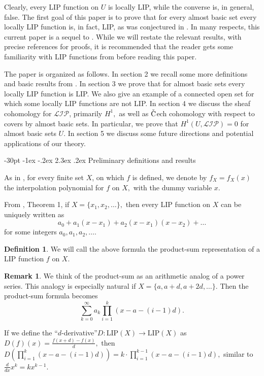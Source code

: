 \documentclass[10pt]{article}
\makeatletter
\renewcommand\section{\@startsection {section}{1}{\z@}
{-30pt \@plus -1ex \@minus -.2ex}
{2.3ex \@plus.2ex}
{\normalfont\normalsize\bfseries\boldmath}}
\theoremstyle{definition}
\newtheorem{definition}{Definition}
\newtheorem{remark}{Remark}
\makeatother
\begin{document}
Clearly, every LIP function on $U$ is locally LIP, while the converse is, in general, false. The first goal of this paper is  to prove that for every almost basic set every locally LIP function is, in fact, LIP, as was conjectured in \cite{LIP}. In many respects, this current paper is a sequel to \cite{LIP}. While we will restate the relevant results, with precise references for proofs, it is recommended that the reader gets some familiarity with LIP functions from \cite{LIP} before reading this paper.

The paper is organized as follows. In section 2 we recall some more definitions and basic results from \cite{LIP}. In section 3 we prove that for almost basic sets every locally LIP function is LIP. We also give an example of a connected open set for which some locally LIP functions are not LIP. In section 4 we discuss the  sheaf cohomology  for $\mathcal{LIP}$,  primarily $H^1,$ as well as $\check{\textrm C}$ech cohomology with respect to covers by almost basic sets. In particular, we prove that  $H^1(U,\mathcal{LIP})=0$ for almost basic sets $U$. In section 5 we discuss some future directions and potential applications of our theory.

\section{Preliminary definitions and results}%

As in \cite{LIP}, for every finite set $X$, on which $f$ is defined, we denote by $f_X=f_X(x)$ the interpolation polynomial for $f$ on $X,$ with the dummy variable $x$.

From \cite{LIP}, Theorem 1, if $X=\{x_1,x_2,\dots \},$ then every LIP function on $X$ can be uniquely written as 
$$a_0+a_1(x-x_1)+a_2(x-x_1)(x-x_2)+\dots$$
for some integers $a_0,a_1,a_2,\dots .$

\begin{definition} We will call the above formula the product-sum representation of a LIP function $f$ on $X.$
\end{definition}

\begin{remark} \label{Rpowerseries} We think of the product-sum as an arithmetic analog of a power series. This analogy is especially natural if $X=\{a,a+d,a+2d,\dots \}.$ Then the product-sum formula becomes $$\sum \limits_{k=0}^{\infty}a_k\prod \limits_{i=1}^k (x-a-(i-1)d).$$

If we define the ``$d$-derivative''$D: \textrm{LIP}(X) \to \textrm{LIP}(X) $ as $D(f) (x)=\frac{f(x+d)-f(x)}{d},$ then $D(\prod \limits_{i=1}^k (x-a-(i-1)d))=k\cdot \prod \limits_{i=1}^{k-1} (x-a-(i-1)d),$ similar to $\frac{d}{dx} x^k=kx^{k-1}.$
\end{remark}
\end{document}
